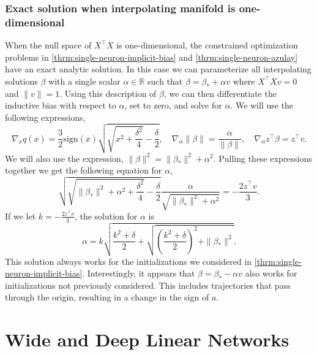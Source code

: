 \documentclass{article}
\theoremstyle{plain}
\theoremstyle{definition}
\theoremstyle{remark}
\begin{document}
\subsubsection{Exact solution when interpolating manifold is one-dimensional}

When the null space of $X^\intercal X$ is one-dimensional, the constrained optimization problems in \cref{thrm:single-neuron-implicit-bias} and \cref{thrm:single-neuron-azulay} have an exact analytic solution.
%
In this case we can parameterize all interpolating solutions $\beta$ with a single scalar $\alpha \in \mathbb{R}$ such that $\beta = \beta_* + \alpha v$ where $X^\intercal X v = 0$ and $\|v\| = 1$.
%
Using this description of $\beta$, we can then differentiate the inductive bias with respect to $\alpha$, set to zero, and solve for $\alpha$.
%
We will use the following expressions,
\begin{equation}
    \nabla_x q(x) = \frac{3}{2}\mathrm{sign}(x)\sqrt{\sqrt{x^2 + \frac{\delta^2}{4}} - \frac{\delta}{2}}, \quad
    \nabla_\alpha \|\beta\| = \frac{\alpha}{\|\beta\|}, \quad
    \nabla_\alpha z^\intercal \beta = z^\intercal v.
\end{equation}
We will also use the expression, $\|\beta\|^2 = \|\beta_*\|^2 + \alpha^2$.
%
Pulling these expressions together we get the following equation for $\alpha$,
\begin{equation}
    \sqrt{\sqrt{\|\beta_*\|^2 + \alpha^2 + \frac{\delta^2}{4}} - \frac{\delta}{2}} \frac{\alpha}{\sqrt{\|\beta_*\|^2 + \alpha^2}} = -\frac{2z^\intercal v}{3}.
\end{equation}
If we let $k = -\frac{2z^\intercal v}{3}$, the solution for $\alpha$ is
\begin{equation}
    \alpha = k \sqrt{\frac{k^2 + \delta}{2} + \sqrt{\left(\frac{k^2 + \delta}{2}\right)^2 + \|\beta_*\|^2}}.
\end{equation}
This solution always works for the initializations we considered in \cref{thrm:single-neuron-implicit-bias}. 
%
Interestingly, it appears that $\beta = \beta_* - \alpha v$ also works for initializations not previously considered. 
%
This includes trajectories that pass through the origin, resulting in a change in the sign of $a$.



\clearpage
\section{Wide and Deep Linear Networks}
\label{app:wide-deep-linear-network}
\end{document}
